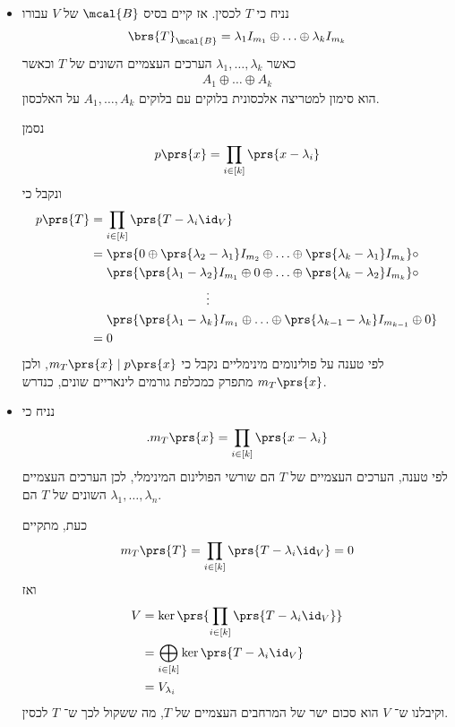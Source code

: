 \documentclass[a4paper,10pt,twoside,openany]{book}
\begin{document}
\begin{solution}
\begin{itemize}
\item
נניח כי
$T$
לכסין. אז קיים בסיס
$\mcal{B}$
של
$V$
עבורו
\begin{align*}
\brs{T}_{\mcal{B}} = \lambda_1 I_{m_1} \oplus \ldots \oplus \lambda_k I_{m_k}
\end{align*}
כאשר
$\lambda_1, \ldots, \lambda_k$
הערכים העצמיים השונים של
$T$
וכאשר
\begin{align*}
A_1 \oplus \ldots \oplus A_k
\end{align*}
הוא סימון למטריצה אלכסונית בלוקים עם בלוקים
$A_1, \ldots, A_k$
על האלכסון.

נסמן
\begin{align*}
p\prs{x} = \prod_{i \in [k]} \prs{x - \lambda_i}
\end{align*}
ונקבל כי
\begin{align*}
p\prs{T} &= \prod_{i \in [k]} \prs{T - \lambda_i \id_V}
\\&=
\prs{0 \oplus \prs{\lambda_2 - \lambda_1} I_{m_2} \oplus \ldots \oplus \prs{\lambda_k - \lambda_1} I_{m_k}} \circ
\\&\hphantom{=.}
\prs{\prs{\lambda_1 - \lambda_2} I_{m_1} \oplus 0 \oplus \ldots \oplus \prs{\lambda_k - \lambda_2} I_{m_k}} \circ
\\&\hphantom{lalalalalalalalalalala} \vdots
\\&\hphantom{=.}
\prs{\prs{\lambda_1 - \lambda_k} I_{m_1} \oplus \ldots \oplus \prs{\lambda_{k-1} - \lambda_k} I_{m_{k-1}} \oplus 0}
\\&=
0
\end{align*}
לפי טענה על פולינומים מינימליים נקבל כי
$m_T\prs{x} \mid p\prs{x}$,
ולכן
$m_T\prs{x}$
מתפרק כמכלפת גורמים לינאריים שונים, כנדרש.

\item
נניח כי
\[\text{.} m_T\prs{x} = \prod_{i \in [k]} \prs{x - \lambda_i}\]
לפי טענה, הערכים העצמיים של
$T$
הם שורשי הפולינום המינימלי, לכן הערכים העצמיים השונים של
$T$
הם
$\lambda_1, \ldots, \lambda_n$.

כעת, מתקיים
\begin{align*}
m_T\prs{T} = \prod_{i \in [k]} \prs{T - \lambda_i \id_V} = 0
\end{align*}
ואז
\begin{align*}
V &= \ker\prs{\prod_{i \in [k]} \prs{T - \lambda_i \id_V}}
\\&= \bigoplus_{i \in [k]} \ker\prs{T - \lambda_i \id_V}
\\&= V_{\lambda_i}
\end{align*}
וקיבלנו ש־%
$V$
הוא סכום ישר של המרחבים העצמיים של
$T$,
מה ששקול לכך ש־%
$T$
לכסין.
\end{itemize}
\end{solution}
\end{document}
